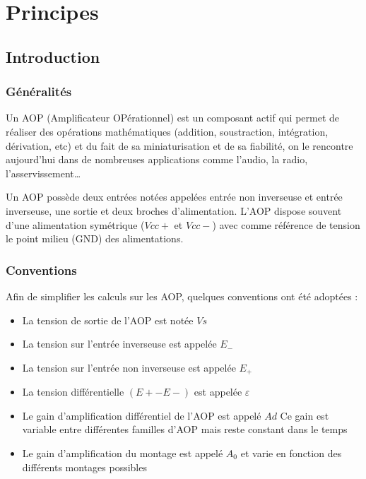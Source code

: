  \part{Principes}

 \chapter{Introduction }
 
 \section{Généralités}

  
Un AOP (Amplificateur OPérationnel) est un composant actif qui permet de réaliser des opérations mathématiques (addition, soustraction, intégration, dérivation, etc) et du fait de sa miniaturisation et de sa fiabilité, on le rencontre aujourd’hui dans de nombreuses applications comme l’audio, la radio, l’asservissement…


Un AOP possède deux entrées notées appelées {\color{red}entrée non inverseuse} et {\color{red}entrée inverseuse}, une {\color{red}sortie} et deux broches d’{\color{red}alimentation}.
L’AOP dispose souvent d’une alimentation symétrique ($Vcc+$ et $Vcc-$) avec comme référence de tension le point milieu (GND) des alimentations.



\section{Conventions}


Afin de simplifier les calculs sur les AOP, quelques conventions ont été adoptées :

\begin{itemize}
  \item La tension de sortie de l’AOP est notée $Vs$
  \item La tension sur l’entrée inverseuse est appelée $E_-$
  \item La tension sur l’entrée non inverseuse est appelée $E_+$
  \item La tension différentielle {\color{red}$(E+-E-)$ est appelée $\varepsilon$}
  \item Le gain d’amplification différentiel de l’AOP est appelé $Ad$
  Ce gain est variable entre différentes familles d’AOP mais reste constant dans le temps
  \item Le gain d’amplification du montage est appelé $A_0$ et varie en fonction des différents montages possibles 
\end{itemize}

